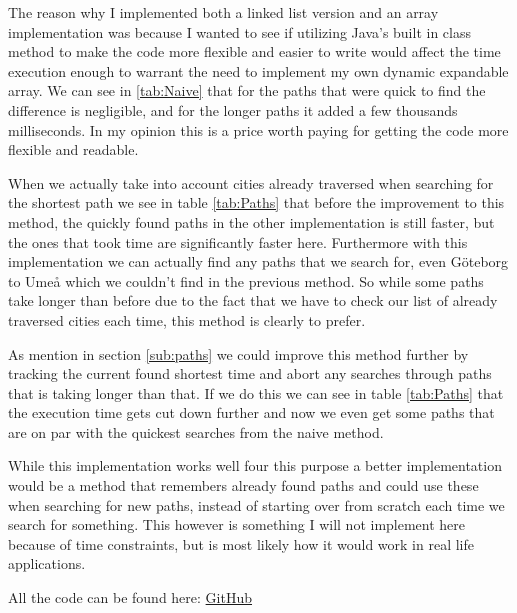 \documentclass[a4paper,11pt]{article}
\begin{document}
The reason why I implemented both a linked list version and an array implementation was because I wanted to see if utilizing Java's built in class method to make
the code more flexible and easier to write would affect the time execution enough to warrant the need to implement my own dynamic expandable array. We can see in
\ref{tab:Naive} that for the paths that were quick to find the difference is negligible, and for the longer paths it added a few thousands milliseconds. In my
opinion this is a price worth paying for getting the code more flexible and readable.

When we  actually take into account cities already traversed when searching for the shortest path we see in table \ref{tab:Paths} that before the improvement to
this method, the quickly found paths in the other implementation is still faster, but the ones that took time are significantly faster here. Furthermore with
this implementation we can actually find any paths that we search for, even Göteborg to Umeå which we couldn't find in the previous method. So while some paths
take longer than before due to the fact that we have to check our list of already traversed cities each time, this method is clearly to prefer.

As mention in section \ref{sub:paths} we could improve this method further by tracking the current found shortest time and abort any searches through paths that
is taking longer than that. If we do this we can see in table \ref{tab:Paths} that the execution time gets cut down further and now we even get some paths that are on
par with the quickest searches from the naive method.

While this implementation works well four this purpose a better implementation would be a method that remembers already found paths and could use these when searching
for new paths, instead of starting over from scratch each time we search for something. This however is something I will not implement here because of time constraints,
but is most likely how it would work in real life applications.

All the code can be found here: \href{https://github.com/adrian-jonsson-sjoedin/ID1021-AlgoData/tree/main/Tasks/Graphs/src}{GitHub}
\end{document}
